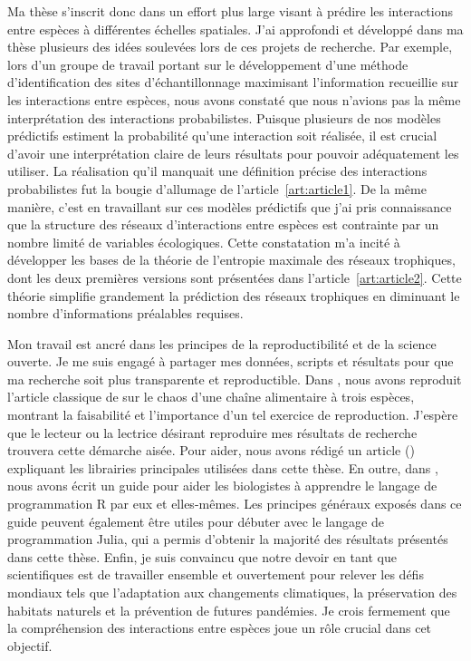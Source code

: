 \documentclass[12pt,twoside,phd]{dms}
\numberwithin{equation}{section}
\numberwithin{table}{chapter}
\numberwithin{figure}{chapter}
\begin{document}
Ma thèse s'inscrit donc dans un effort plus large visant à prédire les
interactions entre espèces à différentes échelles spatiales. J'ai approfondi et
développé dans ma thèse plusieurs des idées soulevées lors de ces projets de
recherche. Par exemple, lors d'un groupe de travail portant sur le développement
d'une méthode d'identification des sites d'échantillonnage maximisant
l'information recueillie sur les interactions entre espèces, nous avons constaté
que nous n'avions pas la même interprétation des interactions probabilistes.
Puisque plusieurs de nos modèles prédictifs estiment la probabilité qu'une
interaction soit réalisée, il est crucial d'avoir une interprétation claire de
leurs résultats pour pouvoir adéquatement les utiliser. La réalisation qu'il
manquait une définition précise des interactions probabilistes fut la bougie
d'allumage de l'article~\ref{art:article1}. De la même manière, c'est en
travaillant sur ces modèles prédictifs que j'ai pris connaissance que la
structure des réseaux d'interactions entre espèces est contrainte par un nombre
limité de variables écologiques. Cette constatation m'a incité à développer les
bases de la théorie de l'entropie maximale des réseaux trophiques, dont les deux
premières versions sont présentées dans l'article~\ref{art:article2}. Cette
théorie simplifie grandement la prédiction des réseaux trophiques en diminuant
le nombre d'informations préalables requises. 

Mon travail est ancré dans les principes de la reproductibilité et de la science
ouverte. Je me suis engagé à partager mes données, scripts et résultats pour que
ma recherche soit plus transparente et reproductible. Dans
\textcite{Dansereau2020Re}, nous avons reproduit l'article classique de
\textcite{Hastings1991Chaos} sur le chaos d'une chaîne alimentaire à trois
espèces, montrant la faisabilité et l'importance d'un tel exercice de
reproduction. J'espère que le lecteur ou la lectrice désirant reproduire mes
résultats de recherche trouvera cette démarche aisée. Pour aider, nous avons
rédigé un article (\cite{Banville2021Mangal}) expliquant les librairies
principales utilisées dans cette thèse. En outre, dans \textcite{Lawlor2022Ten},
nous avons écrit un guide pour aider les biologistes à apprendre le langage de
programmation R par eux et elles-mêmes. Les principes généraux exposés dans ce
guide peuvent également être utiles pour débuter avec le langage de
programmation Julia, qui a permis d'obtenir la majorité des résultats présentés
dans cette thèse. Enfin, je suis convaincu que notre devoir en tant que
scientifiques est de travailler ensemble et ouvertement pour relever les défis
mondiaux tels que l'adaptation aux changements climatiques, la préservation des
habitats naturels et la prévention de futures pandémies. Je crois fermement que
la compréhension des interactions entre espèces joue un rôle crucial dans cet
objectif. 
\end{document}
